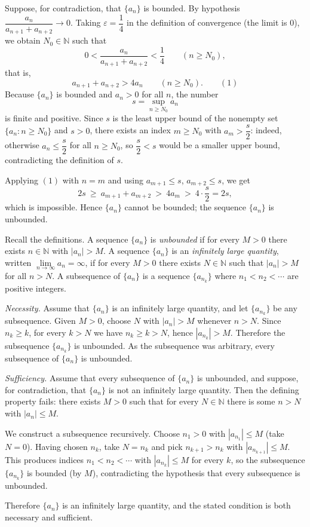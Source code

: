 \documentclass[11pt,a4paper]{article}
\newenvironment{solution}[1]{%
  \par\addvspace{1.7ex}%
  \noindent{\color{solutioncolor}\textbf{#1}}\hspace{0.55em}\ignorespaces}%
  {\par\addvspace{0.9ex}}
\begin{document}
\begin{solution}{Solution 2.1.13}\label{xs:2.1.13}
Suppose, for contradiction, that $\{a_n\}$ is bounded. By hypothesis $\dfrac{a_n}{a_{n+1}+a_{n+2}}\to 0$. Taking $\varepsilon=\dfrac14$ in the definition of convergence (the limit is $0$), we obtain $N_0\in\mathbb{N}$ such that
\[
0<\frac{a_n}{a_{n+1}+a_{n+2}}<\frac14\qquad(n\ge N_0),
\]
that is,
\[
a_{n+1}+a_{n+2}>4a_n\qquad(n\ge N_0).\qquad(1)
\]
Because $\{a_n\}$ is bounded and $a_n>0$ for all $n$, the number
\[
s=\sup_{n\ge N_0}a_n
\]
is finite and positive. Since $s$ is the least upper bound of the nonempty set $\{a_n:n\ge N_0\}$ and $s>0$, there exists an index $m\ge N_0$ with $a_m>\dfrac{s}{2}$: indeed, otherwise $a_n\le \dfrac{s}{2}$ for all $n\ge N_0$, so $\dfrac{s}{2}<s$ would be a smaller upper bound, contradicting the definition of $s$.

Applying $(1)$ with $n=m$ and using $a_{m+1}\le s$, $a_{m+2}\le s$, we get
\[
2s\ \ge\ a_{m+1}+a_{m+2}\ >\ 4a_m\ >\ 4\cdot\frac{s}{2}=2s,
\]
which is impossible. Hence $\{a_n\}$ cannot be bounded; the sequence $\{a_n\}$ is unbounded.
\end{solution}

\begin{solution}{Solution 2.1.14}\label{xs:2.1.14}
Recall the definitions. A sequence $\{a_n\}$ is \emph{unbounded} if for every $M>0$ there exists $n\in\mathbb{N}$ with $|a_n|>M$. A sequence $\{a_n\}$ is an \emph{infinitely large quantity}, written $\lim\limits_{n\to\infty}a_n=\infty$, if for every $M>0$ there exists $N\in\mathbb{N}$ such that $|a_n|>M$ for all $n>N$. A subsequence of $\{a_n\}$ is a sequence $\{a_{n_k}\}$ where $n_1<n_2<\cdots$ are positive integers.

\emph{Necessity.} Assume that $\{a_n\}$ is an infinitely large quantity, and let $\{a_{n_k}\}$ be any subsequence. Given $M>0$, choose $N$ with $|a_n|>M$ whenever $n>N$. Since $n_k\ge k$, for every $k>N$ we have $n_k\ge k>N$, hence $|a_{n_k}|>M$. Therefore the subsequence $\{a_{n_k}\}$ is unbounded. As the subsequence was arbitrary, every subsequence of $\{a_n\}$ is unbounded.

\emph{Sufficiency.} Assume that every subsequence of $\{a_n\}$ is unbounded, and suppose, for contradiction, that $\{a_n\}$ is not an infinitely large quantity. Then the defining property fails: there exists $M>0$ such that for every $N\in\mathbb{N}$ there is some $n>N$ with $|a_n|\le M$.

We construct a subsequence recursively. Choose $n_1>0$ with $|a_{n_1}|\le M$ (take $N=0$). Having chosen $n_k$, take $N=n_k$ and pick $n_{k+1}>n_k$ with $|a_{n_{k+1}}|\le M$. This produces indices $n_1<n_2<\cdots$ with $|a_{n_k}|\le M$ for every $k$, so the subsequence $\{a_{n_k}\}$ is bounded (by $M$), contradicting the hypothesis that every subsequence is unbounded.

Therefore $\{a_n\}$ is an infinitely large quantity, and the stated condition is both necessary and sufficient.
\end{solution}
\end{document}
